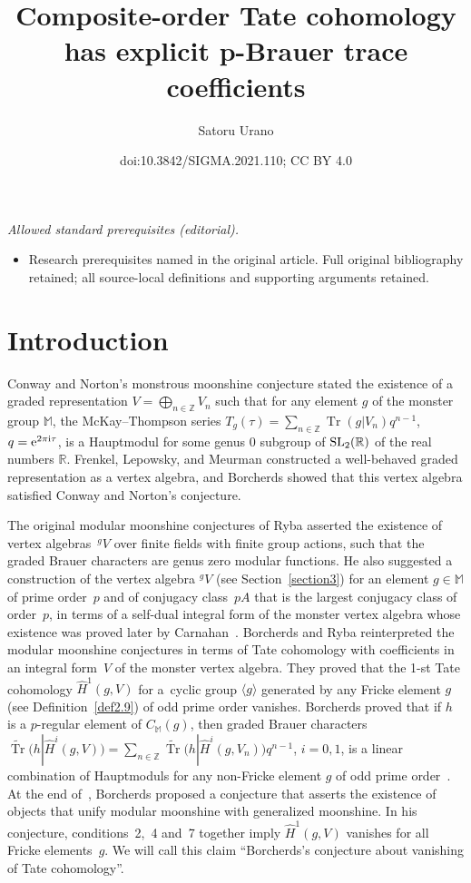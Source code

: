 \documentclass[10pt,a4paper]{amsart}
\title{Composite-order Tate cohomology has explicit p-Brauer trace coefficients}
\author{Satoru Urano}
\date{doi:10.3842/SIGMA.2021.110; CC BY 4.0}
\numberwithin{equation}{section}
\begin{document}
\maketitle
\noindent\textit{Allowed standard prerequisites (editorial).}\begin{itemize}
\item Research prerequisites named in the original article. Full original bibliography retained; all source-local definitions and supporting arguments retained.
\end{itemize}\medskip
\section{Introduction}
Conway and Norton's monstrous moonshine conjecture \cite{CN} stated the existence of a graded representation $V=\bigoplus_{n \in \mathbb{Z}}V_n$ such that for any element $g$ of the monster group $\mathbb{M}$, the McKay--Thompson series $T_g(\tau)=\sum_{n \in \mathbb{Z}}\operatorname{Tr}(g|V_n)q^{n-1}$, $q={\rm e}^{2\pi {\rm i} \tau}$, is a Hauptmodul for some genus $0$ subgroup of ${\rm SL}_2(\mathbb{R})$ of the real numbers $\mathbb{R}$.
Frenkel, Lepowsky, and Meurman \cite{FLM} constructed a well-behaved graded representation as a vertex algebra, and Borcherds \cite{B92} showed that this vertex algebra satisfied Conway and Norton's conjecture.

The original modular moonshine conjectures of Ryba asserted the existence of vertex algebras~$^gV$ over finite fields with finite group actions, such that the graded Brauer characters are genus zero modular functions. He also suggested a construction of the vertex algebra $^{g}V$ (see Section~\ref{section3}) for an element $g \in \mathbb{M}$ of prime order~$p$ and of conjugacy class~$pA$ that is the largest conjugacy class of order~$p$, in terms of a self-dual integral form of the monster vertex algebra whose existence was proved later by Carnahan~\cite{C}.
Borcherds and Ryba reinterpreted the modular moonshine conjectures in terms of Tate cohomology with coefficients in an integral form~$V$ of the monster vertex algebra. They proved that the 1-st Tate cohomology $\hat{H}^1(g,V)$ for a~cyclic group $\langle g \rangle$ generated by any Fricke element $g$ (see Definition~\ref{def2.9}) of odd prime order vanishes. Borcherds proved that if $h$ is a $p$-regular element of $C_{\mathbb{M}}(g)$, then graded Brauer characters
$\widetilde{\operatorname{Tr}}\big(h|{\hat{H}}^i(g,V)\big)=\sum_{n \in \mathbb{Z}} \widetilde{\operatorname{Tr}}\big(h|{\hat{H}}^i(g,V_n)\big)q^{n-1}$, $i=0,1$, is a linear combination of Hauptmoduls for any non-Fricke element $g$ of odd prime order~\cite{B98,BR}. At the end of~\cite{B98}, Borcherds proposed a conjecture that asserts the existence of objects that unify modular moonshine with generalized moonshine. In his conjecture, conditions~2,~4 and~7 together imply $\hat{H}^1(g,V)$ vanishes for all Fricke elements~$g$. We will call this claim ``Borcherds's conjecture about vanishing of Tate cohomology''.
\end{document}
